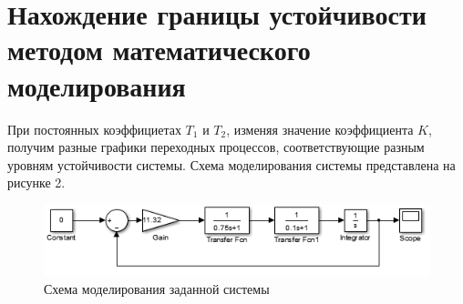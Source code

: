 \documentclass[a4paper, 11pt, russian]{article}
\begin{document}
    \section{Нахождение границы устойчивости методом математического моделирования}
    При постоянных коэффициетах $T_1$ и $T_2$, изменяя значение коэффициента $K$, получим разные графики переходных процессов, соответствующие разным уровням устойчивости системы. Схема моделирования системы представлена на рисунке 2.
    \begin{figure}[h!]
        \centering
        \includegraphics[scale = 1]{modelScheme.png}
        \caption{Схема моделирования заданной системы}
    \end{figure}
    
\end{document}
